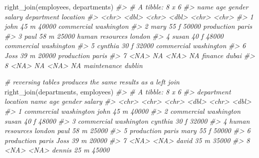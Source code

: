 \documentclass[
]{book}
\newenvironment{Shaded}{\begin{snugshade}}{\end{snugshade}}
\newcommand{\CommentTok}[1]{\textcolor[rgb]{0.56,0.35,0.01}{\textit{#1}}}
\newcommand{\FunctionTok}[1]{\textcolor[rgb]{0.00,0.00,0.00}{#1}}
\newcommand{\NormalTok}[1]{#1}
\begin{document}
\begin{Shaded}
\begin{Highlighting}[]
\FunctionTok{right\_join}\NormalTok{(employees, departments)}
\CommentTok{\#\textgreater{} \# A tibble: 8 x 6}
\CommentTok{\#\textgreater{}   name      age gender salary department      location  }
\CommentTok{\#\textgreater{}   \textless{}chr\textgreater{}   \textless{}dbl\textgreater{} \textless{}chr\textgreater{}   \textless{}dbl\textgreater{} \textless{}chr\textgreater{}           \textless{}chr\textgreater{}     }
\CommentTok{\#\textgreater{} 1 john       45 m       40000 commercial      washington}
\CommentTok{\#\textgreater{} 2 mary       55 f       50000 production      paris     }
\CommentTok{\#\textgreater{} 3 paul       58 m       25000 human resources london    }
\CommentTok{\#\textgreater{} 4 susan      40 f       48000 commercial      washington}
\CommentTok{\#\textgreater{} 5 cynthia    30 f       32000 commercial      washington}
\CommentTok{\#\textgreater{} 6 Joss       39 m       20000 production      paris     }
\CommentTok{\#\textgreater{} 7 \textless{}NA\textgreater{}       NA \textless{}NA\textgreater{}       NA finance         dubai     }
\CommentTok{\#\textgreater{} 8 \textless{}NA\textgreater{}       NA \textless{}NA\textgreater{}       NA maintenance     dublin}

\CommentTok{\# reversing tables produces the same results as a left join}
\FunctionTok{right\_join}\NormalTok{(departments, employees)}
\CommentTok{\#\textgreater{} \# A tibble: 8 x 6}
\CommentTok{\#\textgreater{}   department      location   name      age gender salary}
\CommentTok{\#\textgreater{}   \textless{}chr\textgreater{}           \textless{}chr\textgreater{}      \textless{}chr\textgreater{}   \textless{}dbl\textgreater{} \textless{}chr\textgreater{}   \textless{}dbl\textgreater{}}
\CommentTok{\#\textgreater{} 1 commercial      washington john       45 m       40000}
\CommentTok{\#\textgreater{} 2 commercial      washington susan      40 f       48000}
\CommentTok{\#\textgreater{} 3 commercial      washington cynthia    30 f       32000}
\CommentTok{\#\textgreater{} 4 human resources london     paul       58 m       25000}
\CommentTok{\#\textgreater{} 5 production      paris      mary       55 f       50000}
\CommentTok{\#\textgreater{} 6 production      paris      Joss       39 m       20000}
\CommentTok{\#\textgreater{} 7 \textless{}NA\textgreater{}            \textless{}NA\textgreater{}       david      35 m       35000}
\CommentTok{\#\textgreater{} 8 \textless{}NA\textgreater{}            \textless{}NA\textgreater{}       dennis     25 m       45000}
\end{Highlighting}
\end{Shaded}
\end{document}
